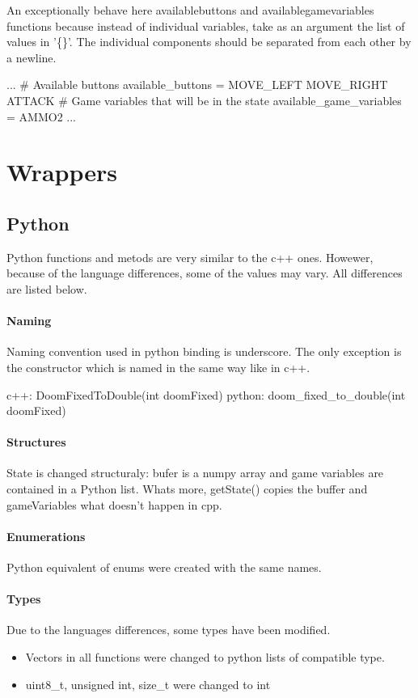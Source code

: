 An exceptionally behave here availablebuttons and availablegamevariables functions because instead of individual variables, take as an argument the list of values in '\{\}'. The individual components should be separated from each other by a newline.
\begin{cblock}
...
# Available buttons
available_buttons = 
	{ 
		MOVE_LEFT 
		MOVE_RIGHT 
		ATTACK 
	}
# Game variables that will be in the state
available_game_variables = { AMMO2}
...
\end{cblock}

\section{Wrappers}
\subsection{Python}

Python functions and metods are very similar to the c++ ones. Howewer, because of the language differences, some of the values may vary. All differences are listed below.

\paragraph {Naming}
Naming convention used in python binding is underscore. The only exception is the constructor which is named in the same way like in c++.

\begin{cblock}
c++: DoomFixedToDouble(int doomFixed)
python: doom_fixed_to_double(int doomFixed)
\end{cblock}


\paragraph {Structures}
 State is changed structuraly: bufer is a numpy array and game variables are contained in a Python list. Whats more, getState() copies the buffer and gameVariables what doesn't happen in cpp. 
\paragraph {Enumerations}
Python equivalent of enums were created with the same names.
\paragraph {Types}
Due to the languages differences, some types have been modified.
\begin{itemize} 
\item Vectors in all functions were changed to python lists of compatible type.

\item  uint8\_t, unsigned int, size\_t were changed to int
\end{itemize}




